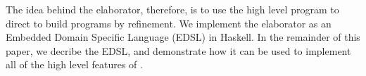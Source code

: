 The idea behind the \Idris{} elaborator, therefore, is to use the high level program
to direct  to build \TT{} programs by refinement. We implement the
elaborator as an Embedded Domain Specific Language (EDSL) in Haskell. 
In the remainder
of this paper, we decribe the EDSL, and demonstrate how it can be used to implement
all of the high level features of \Idris{}.



